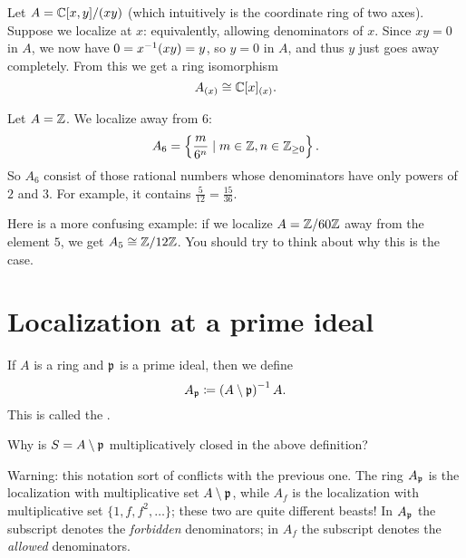 \begin{example}
	Let $A = \mathbb C[x,y] / (xy)$
	(which intuitively is the coordinate ring of two axes).
	Suppose we localize at $x$:
	equivalently, allowing denominators of $x$.
	Since $xy = 0$ in $A$, we now have $0 = x^{-1} (xy) = y$,
	so $y = 0$ in $A$, and thus $y$ just goes away completely.
	From this we get a ring isomorphism
	\[ A_{(x)} \cong \mathbb C[x]_{(x)}. \]
\end{example}

\begin{example}
	\listhack
	\begin{enumerate}[(a)]
		\ii Let $A = \mathbb Z$. We localize away from $6$:
		\[ A_{6} = \left\{ \frac{m}{6^n} \mid m \in \mathbb Z,
			n \in \mathbb Z_{\ge 0} \right\}.  \]
		So $A_6$ consist of those rational numbers whose
		denominators have only powers of $2$ and $3$.
		For example, it contains $\frac{5}{12} = \frac{15}{36}$.

		\ii Here is a more confusing example:
		if we localize $A = \mathbb Z/60\mathbb Z$ away from the element $5$,
		we get $A_5 \cong \mathbb Z/12\mathbb Z$.
		You should try to think about why this is the case.
	\end{enumerate}
\end{example}

\section{Localization at a prime ideal}
\label{sec:localize_prime_ideal}
\begin{definition}
	If $A$ is a ring and $\mathfrak p$ is a prime ideal, then we define
	\[ A_\mathfrak p \coloneqq \left( A \setminus \mathfrak p \right)^{-1} A. \]
	This is called the .
\end{definition}
\begin{ques}
	Why is $S = A \setminus \mathfrak p$ multiplicatively closed
	in the above definition?
\end{ques}

Warning: this notation sort of conflicts with the previous one.
The ring $A_\mathfrak p$ is the localization with multiplicative set $A \setminus \mathfrak p$,
while $A_f$ is the localization with multiplicative set $\{1,f,f^2,\dots\}$;
these two are quite different beasts!
In $A_\mathfrak p$ the subscript denotes the \emph{forbidden} denominators;
in $A_f$ the subscript denotes the \emph{allowed} denominators.

